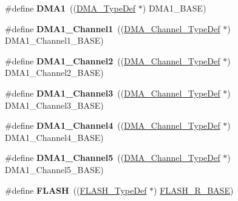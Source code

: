 \begin{DoxyCompactItemize}
\item 
\mbox{\label{group___peripheral__declaration_gacc16d2a5937f7585320a98f7f6b578f9}} 
\#define {\bfseries D\+M\+A1}~((\hyperlink{struct_d_m_a___type_def}{D\+M\+A\+\_\+\+Type\+Def} $\ast$) D\+M\+A1\+\_\+\+B\+A\+SE)
\item 
\mbox{\label{group___peripheral__declaration_gac83c5be824be1c02716e2522e80ddf7a}} 
\#define {\bfseries D\+M\+A1\+\_\+\+Channel1}~((\hyperlink{struct_d_m_a___channel___type_def}{D\+M\+A\+\_\+\+Channel\+\_\+\+Type\+Def} $\ast$) D\+M\+A1\+\_\+\+Channel1\+\_\+\+B\+A\+SE)
\item 
\mbox{\label{group___peripheral__declaration_ga23d7631dd10c645e06971b2543ba2949}} 
\#define {\bfseries D\+M\+A1\+\_\+\+Channel2}~((\hyperlink{struct_d_m_a___channel___type_def}{D\+M\+A\+\_\+\+Channel\+\_\+\+Type\+Def} $\ast$) D\+M\+A1\+\_\+\+Channel2\+\_\+\+B\+A\+SE)
\item 
\mbox{\label{group___peripheral__declaration_gacf7b6093a37b306d7f1f50b2f200f0d0}} 
\#define {\bfseries D\+M\+A1\+\_\+\+Channel3}~((\hyperlink{struct_d_m_a___channel___type_def}{D\+M\+A\+\_\+\+Channel\+\_\+\+Type\+Def} $\ast$) D\+M\+A1\+\_\+\+Channel3\+\_\+\+B\+A\+SE)
\item 
\mbox{\label{group___peripheral__declaration_gad2c42743316bf64da557130061b1f56a}} 
\#define {\bfseries D\+M\+A1\+\_\+\+Channel4}~((\hyperlink{struct_d_m_a___channel___type_def}{D\+M\+A\+\_\+\+Channel\+\_\+\+Type\+Def} $\ast$) D\+M\+A1\+\_\+\+Channel4\+\_\+\+B\+A\+SE)
\item 
\mbox{\label{group___peripheral__declaration_ga06ff98ddef3c962795d2e2444004abff}} 
\#define {\bfseries D\+M\+A1\+\_\+\+Channel5}~((\hyperlink{struct_d_m_a___channel___type_def}{D\+M\+A\+\_\+\+Channel\+\_\+\+Type\+Def} $\ast$) D\+M\+A1\+\_\+\+Channel5\+\_\+\+B\+A\+SE)
\item 
\mbox{\label{group___peripheral__declaration_ga844ea28ba1e0a5a0e497f16b61ea306b}} 
\#define {\bfseries F\+L\+A\+SH}~((\hyperlink{struct_f_l_a_s_h___type_def}{F\+L\+A\+S\+H\+\_\+\+Type\+Def} $\ast$) \hyperlink{group___peripheral__memory__map_ga8e21f4845015730c5731763169ec0e9b}{F\+L\+A\+S\+H\+\_\+\+R\+\_\+\+B\+A\+SE})

\end{DoxyCompactItemize}

